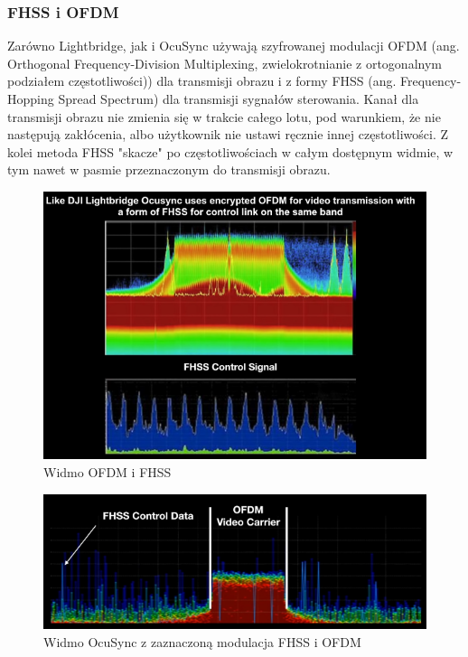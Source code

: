 \newpage
\subsubsection{FHSS i  OFDM}

Zarówno Lightbridge, jak i OcuSync używają szyfrowanej modulacji OFDM (ang. Orthogonal Frequency-Division Multiplexing, zwielokrotnianie z ortogonalnym podziałem częstotliwości)) dla transmisji obrazu i z formy FHSS (ang. Frequency-Hopping Spread Spectrum) dla transmisji sygnałów sterowania. Kanał dla transmisji obrazu nie zmienia się w trakcie całego lotu, pod warunkiem, że nie następują zakłócenia, albo użytkownik nie ustawi ręcznie innej częstotliwości. Z kolei metoda FHSS "skacze" po częstotliwościach w całym dostępnym widmie, w tym nawet w pasmie przeznaczonym do transmisji obrazu.\cite{FHSS-wiki} \cite{OFDM-wiki}

\begin{figure}[!htbp]
\begin{center}
  \includegraphics[width=14cm]{./Obrazy/ocusync_spectrum_1.png}
\caption{Widmo OFDM i FHSS}
\end{center}
\end{figure}

\begin{figure}[!htbp]
\begin{center}
  \includegraphics[width=14cm]{./Obrazy/ocusync_spectrum_2.png}
\caption{Widmo OcuSync z zaznaczoną modulacja FHSS i OFDM}
\end{center}
\end{figure}


